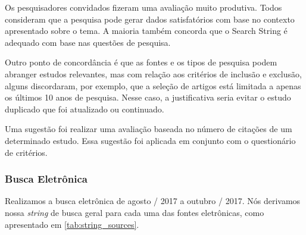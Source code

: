 Os pesquisadores convidados fizeram uma avaliação muito produtiva. Todos consideram que a pesquisa pode gerar dados satisfatórios com base no contexto apresentado sobre o tema. A maioria também concorda que o Search String é adequado com base nas questões de pesquisa.

Outro ponto de concordância é que as fontes e os tipos de pesquisa podem abranger estudos relevantes, mas com relação aos critérios de inclusão e exclusão, alguns discordaram, por exemplo, que a seleção de artigos está limitada a apenas os últimos 10 anos de pesquisa. Nesse caso, a justificativa seria evitar o estudo duplicado que foi atualizado ou continuado.

Uma sugestão foi realizar uma avaliação baseada no número de citações de um determinado estudo. Essa sugestão foi aplicada em conjunto com o questionário de critérios.

\subsubsection{Busca Eletrônica}
\label{sec:searchelectronic}

Realizamos a busca eletrônica de agosto / 2017 a outubro / 2017. Nós derivamos nossa \textit{string} de busca geral para cada uma das fontes eletrônicas, como apresentado em \ref{tab:string_sources}.

